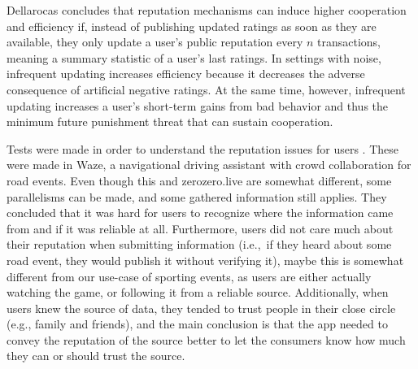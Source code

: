 Dellarocas \cite{Dellarocas2006-update-freq} concludes that reputation mechanisms can induce higher cooperation and efficiency if, instead of publishing updated ratings as soon as they are available, they only update a user's public reputation every $n$ transactions, meaning a summary statistic of a user's last ratings. In settings with noise, infrequent updating increases efficiency because it decreases the adverse consequence of artificial negative ratings. At the same time, however, infrequent updating increases a user's short-term gains from bad behavior and thus the minimum future punishment threat that can sustain cooperation.

Tests were made in order to understand the reputation issues for users \cite{Afonso2016}. These were made in Waze, a navigational driving assistant with crowd collaboration for road events. Even though this and zerozero.live are somewhat different, some parallelisms can be made, and some gathered information still applies. They concluded that it was hard for users to recognize where the information came from and if it was reliable at all. Furthermore, users did not care much about their reputation when submitting information (i.e.,\ if they heard about some road event, they would publish it without verifying it), maybe this is somewhat different from our use-case of sporting events, as users are either actually watching the game, or following it from a reliable source. Additionally, when users knew the source of data, they tended to trust people in their close circle (e.g., family and friends), and the main conclusion is that the app needed to convey the reputation of the source better to let the consumers know how much they can or should trust the source.

